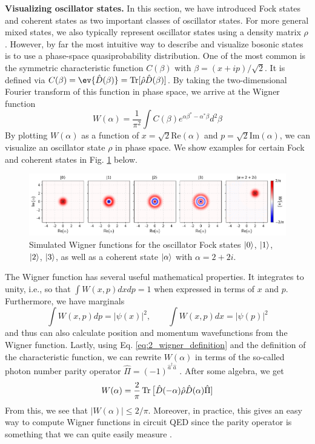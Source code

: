 \noindent \textbf{Visualizing oscillator states.} In this section, we have introduced Fock states and coherent states as two important classes of oscillator states. For more general mixed states, we also typically represent oscillator states using a density matrix $\rho$. However, by far the most intuitive way to describe and visualize bosonic states is to use a phase-space quasiprobability distribution. One of the most common is the symmetric characteristic function $C(\beta)$ with $\beta = (x+ip)/\sqrt{2}$. It is defined via $C(\beta) = \ev{\hat{D}(\beta)} = \Tr[\hat{\rho} \hat{D}(\beta)]$. By taking the two-dimensional Fourier transform of this function in phase space, we arrive at the Wigner function
\begin{equation}
    W(\alpha) = \frac{1}{\pi^2}\int C(\beta) e^{\alpha\beta^\ast - \alpha^\ast\beta} d^2\beta
    \label{eq:2_wigner_definition}
\end{equation}
By plotting $W(\alpha)$ as a function of $x = \sqrt{2}\mathrm{Re}(\alpha)$ and $p = \sqrt{2}\mathrm{Im}(\alpha)$, we can visualize an oscillator state $\rho$ in phase space. We show examples for certain Fock and coherent states in Fig. \ref{fig:2_Fock_Wigners} below. 

\begin{figure}[h]
    \centering
    \includegraphics[width=\linewidth]{Figures/2/Fock_Wigners.pdf}
    \caption{Simulated Wigner functions for the oscillator Fock states $\lvert0\rangle$, $\lvert1\rangle$, $\lvert2\rangle$, $\lvert3\rangle$, as well as a coherent state $\lvert\alpha\rangle$ with $\alpha = 2 + 2i$. }
    \label{fig:2_Fock_Wigners}
\end{figure}

The Wigner function has several useful mathematical properties. It integrates to unity, i.e., so that $\int W(x, p)dxdp = 1$ when expressed in terms of $x$ and $p$. Furthermore, we have marginals
\begin{equation}
    \int W(x, p)dp = |\psi(x)|^2, \qquad \int W(x, p)dx = |\psi(p)|^2
\end{equation}
and thus can also calculate position and momentum wavefunctions from the Wigner function. Lastly, using Eq. \eqref{eq:2_wigner_definition} and the definition of the characteristic function, we can rewrite $W(\alpha)$ in terms of the so-called photon number parity operator $\hat{\Pi} = (-1)^{\hat{a}^\dagger\hat{a}}$ \cite{royer1977wigner, lutterbach1997method}. After some algebra, we get
\begin{equation}
    W(\alpha) = \frac{2}{\pi}\operatorname{Tr}\big[\hat{D}(-\alpha)\hat{\rho}\hat{D}(\alpha)\hat{\Pi}]
\end{equation}
From this, we see that $|W(\alpha)| \leq 2/\pi$. Moreover, in practice, this gives an easy way to compute Wigner functions in circuit QED since the parity operator is something that we can quite easily measure \cite{sun2014tracking}. 


